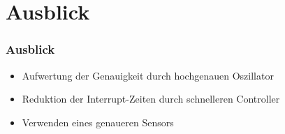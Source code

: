 \section{Ausblick}
\begin{frame}
	\frametitle{Ausblick}
	\begin{itemize}
		\item Aufwertung der Genauigkeit durch hochgenauen Oszillator
		\item Reduktion der Interrupt-Zeiten durch schnelleren Controller
		\item Verwenden eines genaueren Sensors
	\end{itemize}
\end{frame}